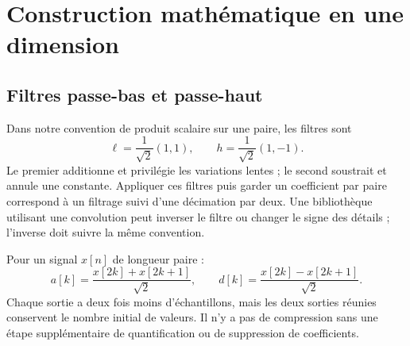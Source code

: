 \begin{center}
\end{center}

\section{Construction mathématique en une dimension}
\subsection{Filtres passe-bas et passe-haut}
Dans notre convention de produit scalaire sur une paire, les filtres sont
\begin{equation}
\ell=\frac{1}{\sqrt{2}}(1,1),\qquad
h=\frac{1}{\sqrt{2}}(1,-1).
\end{equation}
Le premier additionne et privilégie les variations lentes ; le second
soustrait et annule une constante. Appliquer ces filtres puis garder un
coefficient par paire correspond à un filtrage suivi d'une décimation par deux.
Une bibliothèque utilisant une convolution peut inverser le filtre ou changer
le signe des détails ; l'inverse doit suivre la même convention.

Pour un signal $x[n]$ de longueur paire :
\begin{equation}
a[k]=\frac{x[2k]+x[2k+1]}{\sqrt{2}},\qquad
d[k]=\frac{x[2k]-x[2k+1]}{\sqrt{2}}.
\end{equation}
Chaque sortie a deux fois moins d'échantillons, mais les deux sorties réunies
conservent le nombre initial de valeurs. Il n'y a pas de compression sans
une étape supplémentaire de quantification ou de suppression de coefficients.

